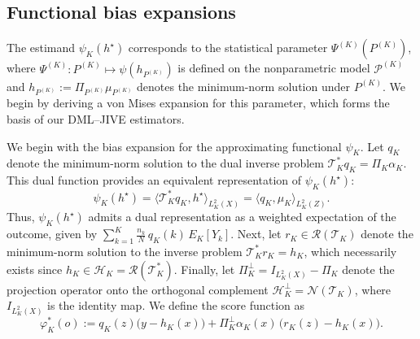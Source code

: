 \documentclass[11pt]{article}
\theoremstyle{plain}
\theoremstyle{definition}
\theoremstyle{remark}
\theoremstyle{definition}
\begin{document}
\subsection{Functional bias expansions}

\label{sec::vonmises}
The estimand \(\psi_K(h^\star)\) corresponds to the statistical parameter
\(\Psi^{(K)}(P^{(K)})\), where \(\Psi^{(K)}: P^{(K)} \mapsto
\psi(h_{P^{(K)}})\) is defined on the nonparametric model \(\mathcal{P}^{(K)}\)
and \(h_{P^{(K)}} := \Pi_{P^{(K)}} \mu_{P^{(K)}}\) denotes the minimum-norm
solution under \(P^{(K)}\). We begin by deriving a von Mises expansion for this
parameter, which forms the basis of our DML–JIVE estimators.




We begin with the bias expansion for the approximating functional $\psi_K$. Let \(q_K\) denote the minimum-norm solution to the dual inverse problem \(\mathcal{T}_K^* q_K = \Pi_K \alpha_K\). This dual function provides an equivalent representation of \(\psi_K(h^\star)\):
\begin{equation}
    \psi_K(h^\star) = \langle \mathcal{T}_K^* q_K, h^\star \rangle_{L^2_K(X)} = \langle q_K, \mu_K \rangle_{L^2_K(Z)}.
\end{equation}
Thus, \(\psi_K(h^\star)\) admits a dual representation as a weighted expectation of the outcome, given by \(\sum_{k=1}^K \frac{n_k}{N}\, q_K(k)\, E_K[Y_k]\). Next, let \(r_K \in \mathcal{R}(\mathcal{T}_K)\) denote the minimum-norm solution to the inverse problem \(\mathcal{T}_K^* r_K = h_K\), which necessarily exists since \(h_K \in \mathcal{H}_K = \mathcal{R}(\mathcal{T}_K^*)\). Finally, let \(\Pi_K^\perp = I_{L^2_K(X)} - \Pi_K\) denote the projection operator onto the orthogonal complement \(\mathcal{H}_K^\perp = \mathcal{N}(\mathcal{T}_K)\), where \(I_{L^2_K(X)}\) is the identity map. We define the score function as
\[
\varphi_K^*(o)
    := q_K(z)\bigl(y - h_K(x)\bigr)
       + \Pi_K^\perp \alpha_K(x)\,\bigl(r_K(z) - h_K(x)\bigr).
\]
\end{document}
